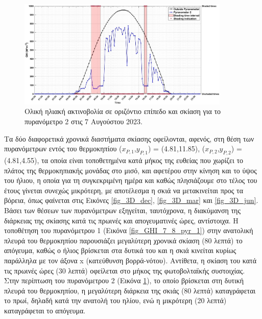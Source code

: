\documentclass[12pt, a4paper]{report} %
\newcommand{\english}{\foreignlanguage{english}}
\begin{document}
\newpage

\begin{figure}[ht]%
    \centering
    \includegraphics[width=0.9\textwidth]{Figures/GHI_7_8_pyr_2.jpg}
    \caption{Ολική ηλιακή ακτινοβολία σε οριζόντιο επίπεδο και σκίαση για το πυρανόμετρο 2 στις 7 Αυγούστου 2023.}
    \label{fig_GHI_7_8_pyr_2}
\end{figure}

Τα δύο διαφορετικά χρονικά διαστήματα σκίασης οφείλονται, αφενός, στη θέση των πυρανόμετρων εντός του θερμοκηπίου 
(\english{$x_{P,1}$,$y_{P,1}$}) = (4.81,11.85), (\english{$x_{P,2}$,$y_{P,2}$}) = (4.81,4.55), τα οποία είναι 
τοποθετημένα κατά μήκος της ευθείας που χωρίζει το πλάτος της θερμοκηπιακής μονάδας στο μισό, και αφετέρου στην 
κίνηση και το ύψος του ήλιου, η οποία για τη συγκεκριμένη ημέρα και καθώς πλησιάζουμε στο τέλος του έτους γίνεται 
συνεχώς μικρότερη, με αποτέλεσμα η σκιά να μετακινείται προς τα βόρεια, όπως φαίνεται στις Εικόνες \ref{fig_3D_dec}, 
\ref{fig_3D_mar} και \ref{fig_3D_jun}. Βάσει των θέσεων των πυρανόμετρων εξηγείται, ταυτόχρονα, η διακύμανση της 
διάρκειας της σκίασης κατά τις πρωινές και απογευματινές ώρες, αντίστοιχα. Η τοποθέτηση του πυρανόμετρου 1 (Εικόνα 
\ref{fig_GHI_7_8_pyr_1}) στην ανατολική πλευρά του θερμοκηπίου παρουσιάζει μεγαλύτερη χρονικά σκίαση (80 λεπτά) το 
απόγευμα, καθώς ο ήλιος βρίσκεται στα δυτικά του και η σκιά κινείται κυρίως παράλληλα με τον άξονα \english{x} 
(κατεύθυνση βορρά-νότου). Αντίθετα, η σκίαση του κατά τις πρωινές ώρες (30 λεπτά) οφείλεται στο μήκος της φωτοβολταϊκής 
συστοιχίας. Στην περίπτωση του πυρανόμετρου 2 (Εικόνα \ref{fig_GHI_7_8_pyr_2}), το οποίο βρίσκεται στη δυτική πλευρά του 
θερμοκηπίου, η μεγαλύτερη διάρκεια της σκιάς (80 λεπτά) καταγράφεται το πρωί, δηλαδή κατά την ανατολή του ηλίου, ενώ η 
μικρότερη (20 λεπτά) καταγράφεται το απόγευμα.
\end{document}
